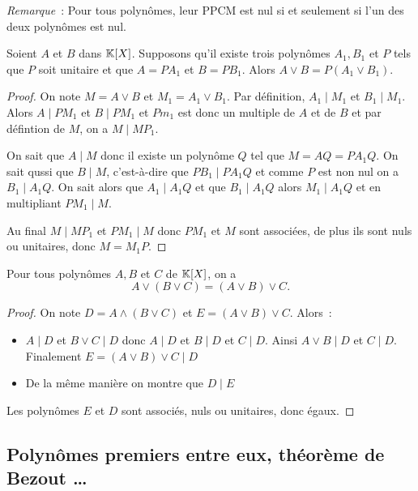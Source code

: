 \emph{Remarque}~: Pour tous polynômes, leur PPCM est nul si et seulement si l'un des deux polynômes est nul.

\begin{prop}
  Soient $A$ et $B$ dans $\mathbb{K}[X]$. Supposons qu'il existe trois polynômes $A_1,B_1$ et $P$ tels que $P$ soit unitaire et que $A=PA_1$ et $B=PB_1$. Alors $A\vee B = P(A_1 \vee B_1)$.
\end{prop}
\begin{proof}
  On note $M=A \vee B$ et $M_1=A_1 \vee B_1$. Par définition, $A_1\mid{}M_1$ et $B_1\mid{}M_1$. Alors $A\mid{}PM_1$ et $B\mid{}PM_1$ et $Pm_1$ est donc un multiple de $A$ et de $B$ et par défintion de $M$, on a $M\mid{}MP_1$.

  On sait que $A\mid{}M$ donc il existe un polynôme $Q$ tel que $M=AQ=PA_1Q$. On sait qussi que $B\mid{}M$, c'est-à-dire que $PB_1\mid{}PA_1Q$ et comme $P$ est non nul on a $B_1\mid{}A_1Q$. On sait alors que $A_1\mid{}A_1Q$ et que $B_1\mid{}A_1Q$ alors $M_1\mid{}A_1Q$ et en multipliant $PM_1\mid{}M$.

  Au final $M\mid{}MP_1$ et $PM_1\mid{}M$ donc $PM_1$ et $M$ sont associées, de plus ils sont nuls ou unitaires, donc $M=M_1P$.
\end{proof}

\begin{prop}[Associativité]
  Pour tous polynômes $A,B$ et $C$ de $\mathbb{K}[X]$, on a
  \begin{equation}
    A \vee (B\vee C) = (A\vee B) \vee C.
  \end{equation}
\end{prop}
\begin{proof}
  On note $D=A \wedge (B\vee C)$ et $E=(A\vee B) \vee C$. Alors~:
  \begin{itemize}
  \item $A\mid{}D$ et $B \vee C\mid{}D$ donc $A\mid{}D$ et $B\mid{}D$ et $C\mid{} D$. Ainsi $A \vee B\mid{}D$ et $C\mid{}D$. Finalement $E=(A\vee B) \vee C\mid{}D$
  \item De la même manière on montre que $D\mid{}E$
  \end{itemize}
  Les polynômes $E$ et $D$ sont associés, nuls ou unitaires, donc égaux.
\end{proof}

\subsection{Polynômes premiers entre eux, théorème de Bezout \ldots}

